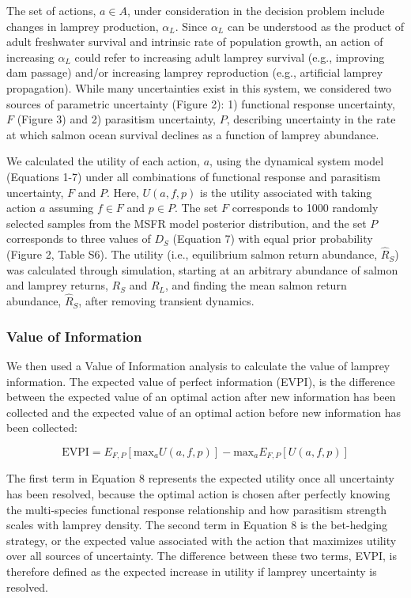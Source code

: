 \documentclass{article}
\begin{document}
The set of actions, $a \in A$, under consideration in the decision problem include changes in lamprey production, $\alpha_L$. Since $\alpha_L$ can be understood as the product of adult freshwater survival and intrinsic rate of population growth, an action of increasing $\alpha_L$ could refer to increasing adult lamprey survival (e.g., improving dam passage) and/or increasing lamprey reproduction (e.g., artificial lamprey propagation). While many uncertainties exist in this system, we considered two sources of parametric uncertainty (Figure 2): 1) functional response uncertainty, $F$ (Figure 3) and 2) parasitism uncertainty, $P$, describing uncertainty in the rate at which salmon ocean survival declines as a function of lamprey abundance.

We calculated the utility of each action, $a$, using the dynamical system model (Equations 1-7) under all combinations of functional response and parasitism uncertainty, $F$ and $P$. Here, $U(a, f, p)$ is the utility associated with taking action $a$ assuming $f \in F$ and $p \in P$. The set $F$ corresponds to 1000 randomly selected samples from the MSFR model posterior distribution, and the set $P$ corresponds to three values of $D_S$ (Equation 7) with equal prior probability (Figure 2, Table S6). The utility (i.e., equilibrium salmon return abundance, $\hat{R}_S$) was calculated through simulation, starting at an arbitrary abundance of salmon and lamprey returns, $R_S$ and $R_L$, and finding the mean salmon return abundance, $\hat{R}_S$, after removing transient dynamics.

\subsubsection*{Value of Information}

We then used a Value of Information analysis to calculate the value of lamprey information. The expected value of perfect information (EVPI), is the difference between the expected value of an optimal action after new information has been collected and the expected value of an optimal action before new information has been collected:

\begin{equation}
\text{EVPI} = E_{F,P}[\text{max}_aU(a,f,p)] - \text{max}_aE_{F,P}[U(a,f,p)]
\end{equation} 

The first term in Equation 8 represents the expected utility once all uncertainty has been resolved, because the optimal action is chosen after perfectly knowing the multi-species functional response relationship and how parasitism strength scales with lamprey density. The second term in Equation 8 is the bet-hedging strategy, or the expected value associated with the action that maximizes utility over all sources of uncertainty. The difference between these two terms, EVPI, is therefore defined as the expected increase in utility if lamprey uncertainty is resolved.
\end{document}

